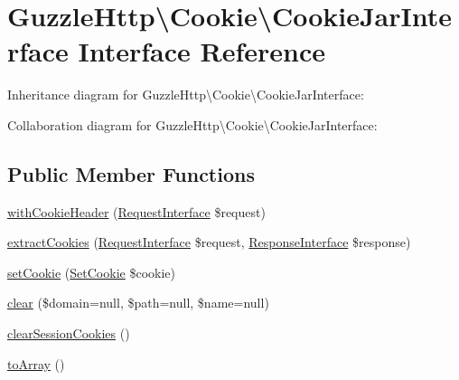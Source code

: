 \hypertarget{interfaceGuzzleHttp_1_1Cookie_1_1CookieJarInterface}{}\section{Guzzle\+Http\textbackslash{}Cookie\textbackslash{}Cookie\+Jar\+Interface Interface Reference}
\label{interfaceGuzzleHttp_1_1Cookie_1_1CookieJarInterface}


Inheritance diagram for Guzzle\+Http\textbackslash{}Cookie\textbackslash{}Cookie\+Jar\+Interface\+:


Collaboration diagram for Guzzle\+Http\textbackslash{}Cookie\textbackslash{}Cookie\+Jar\+Interface\+:
\subsection*{Public Member Functions}
\begin{DoxyCompactItemize}
\item 
\hyperlink{interfaceGuzzleHttp_1_1Cookie_1_1CookieJarInterface_a677129d290a059ebd29b00663b63c051}{with\+Cookie\+Header} (\hyperlink{interfacePsr_1_1Http_1_1Message_1_1RequestInterface}{Request\+Interface} \$request)
\item 
\hyperlink{interfaceGuzzleHttp_1_1Cookie_1_1CookieJarInterface_a2167d5ad5dbfbe7823f0c92d60fd376d}{extract\+Cookies} (\hyperlink{interfacePsr_1_1Http_1_1Message_1_1RequestInterface}{Request\+Interface} \$request, \hyperlink{interfacePsr_1_1Http_1_1Message_1_1ResponseInterface}{Response\+Interface} \$response)
\item 
\hyperlink{interfaceGuzzleHttp_1_1Cookie_1_1CookieJarInterface_a9e9225852ba0caa3f0c241d49167f8bf}{set\+Cookie} (\hyperlink{classGuzzleHttp_1_1Cookie_1_1SetCookie}{Set\+Cookie} \$cookie)
\item 
\hyperlink{interfaceGuzzleHttp_1_1Cookie_1_1CookieJarInterface_a2af2d155340b18fe8c901cbe8a7623ce}{clear} (\$domain=null, \$path=null, \$name=null)
\item 
\hyperlink{interfaceGuzzleHttp_1_1Cookie_1_1CookieJarInterface_abd31effbb05237e8c730b03951b6d3ab}{clear\+Session\+Cookies} ()
\item 
\hyperlink{interfaceGuzzleHttp_1_1Cookie_1_1CookieJarInterface_a558432f6d2d19c8cf12f93aab90dd237}{to\+Array} ()
\end{DoxyCompactItemize}


